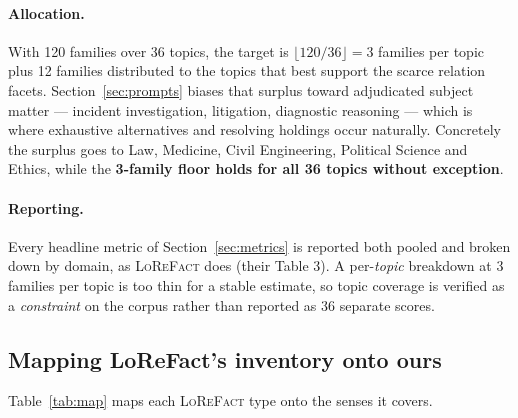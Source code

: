 \documentclass[11pt]{article}
\begin{document}
\paragraph{Allocation.} With 120 families over 36 topics, the target is
$\lfloor 120/36 \rfloor = 3$ families per topic plus 12 families distributed to the topics that
best support the scarce relation facets. Section~\ref{sec:prompts} biases that surplus toward
adjudicated subject matter --- incident investigation, litigation, diagnostic reasoning --- which
is where exhaustive alternatives and resolving holdings occur naturally. Concretely the surplus
goes to Law, Medicine, Civil Engineering, Political Science and Ethics, while the
\textbf{3-family floor holds for all 36 topics without exception}.

\paragraph{Reporting.} Every headline metric of Section~\ref{sec:metrics} is reported both
pooled and broken down by domain, as \textsc{LoReFact} does (their Table 3). A per-\emph{topic}
breakdown at 3 families per topic is too thin for a stable estimate, so topic coverage is
verified as a \emph{constraint} on the corpus rather than reported as 36 separate scores.

\subsection{Mapping LoReFact's inventory onto ours}
\label{sec:mapping}

Table~\ref{tab:map} maps each \textsc{LoReFact} type onto the senses it covers.
\end{document}
